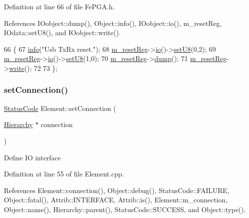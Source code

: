 Definition at line 66 of file Fe\+P\+G\+A.\+h.



References I\+Oobject\+::dump(), Object\+::info(), I\+Oobject\+::io(), m\+\_\+reset\+Reg, I\+Odata\+::set\+U8(), and I\+Oobject\+::write().


\begin{DoxyCode}
66                  \{
67     \hyperlink{classObject_a644fd329ea4cb85f54fa6846484b84a8}{info}(\textcolor{stringliteral}{"Usb TxRx reset."});
68     \hyperlink{classFePGA_aeff1a2370237a06b50e1ae23d933c862}{m\_resetReg}->\hyperlink{classIOobject_af04fb94137c3d86849f478ac5afab5d1}{io}()->\hyperlink{classIOdata_a6c4fb2f2af01889ada889c2b7aceb24d}{setU8}(0,2);
69     \hyperlink{classFePGA_aeff1a2370237a06b50e1ae23d933c862}{m\_resetReg}->\hyperlink{classIOobject_af04fb94137c3d86849f478ac5afab5d1}{io}()->\hyperlink{classIOdata_a6c4fb2f2af01889ada889c2b7aceb24d}{setU8}(1,0); 
70     \hyperlink{classFePGA_aeff1a2370237a06b50e1ae23d933c862}{m\_resetReg}->\hyperlink{classIOobject_a1247f08c84c1732a76caf07e987871e9}{dump}();
71     \hyperlink{classFePGA_aeff1a2370237a06b50e1ae23d933c862}{m\_resetReg}->\hyperlink{classIOobject_a9f6984bc9f0fadcf800f1be2523ac744}{write}();
72     
73   \};
\end{DoxyCode}
\mbox{\label{classElement_ab476b4b1df5954141ceb14f072433b89}} 
\subsubsection{\texorpdfstring{set\+Connection()}{setConnection()}}
{\footnotesize\ttfamily \hyperlink{classStatusCode}{Status\+Code} Element\+::set\+Connection (\begin{DoxyParamCaption}\item[{\hyperlink{classHierarchy}{Hierarchy} $\ast$}]{connection }\end{DoxyParamCaption})\hspace{0.3cm}{\ttfamily [inherited]}}

Define IO interface 

Definition at line 55 of file Element.\+cpp.



References Element\+::connection(), Object\+::debug(), Status\+Code\+::\+F\+A\+I\+L\+U\+RE, Object\+::fatal(), Attrib\+::\+I\+N\+T\+E\+R\+F\+A\+CE, Attrib\+::is(), Element\+::m\+\_\+connection, Object\+::name(), Hierarchy\+::parent(), Status\+Code\+::\+S\+U\+C\+C\+E\+SS, and Object\+::type().




